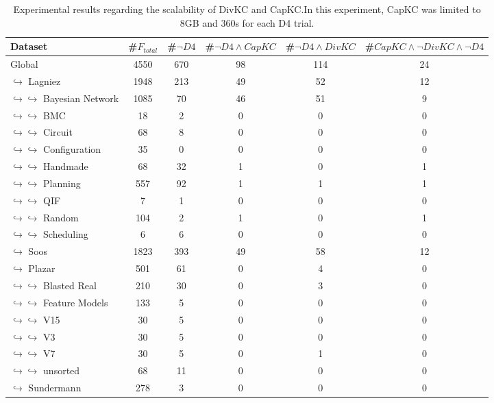 \documentclass{article}
\newcommand\dfour[0]{D4\xspace}
\newcommand\divkc[0]{DivKC\xspace}
\newcommand\capkc[0]{CapKC\xspace}
\begin{document}
    
\begin{table}[h!]
        \centering
        \begin{tabular}{l|c|c|c|c|c}
            Dataset & \#$F_\textit{total}$ & \#$\neg \textit{\dfour}$ & \#$\neg \textit{\dfour} \land \textit{\capkc}$ & \#$\neg \textit{\dfour} \land \textit{\divkc}$ &  \#$\textit{\capkc} \land \neg \textit{\divkc} \land \neg \textit{\dfour}$\\ 
            \hline
Global & 4550 & 670 & 98 & 114 & 24 \\
$\hookrightarrow$ Lagniez \cite{D4} & 1948 & 213 & 49 & 52 & 12 \\
$\hookrightarrow \hookrightarrow$ Bayesian Network & 1085 & 70 & 46 & 51 & 9 \\
$\hookrightarrow \hookrightarrow$ BMC & 18 & 2 & 0 & 0 & 0 \\
$\hookrightarrow \hookrightarrow$ Circuit & 68 & 8 & 0 & 0 & 0 \\
$\hookrightarrow \hookrightarrow$ Configuration & 35 & 0 & 0 & 0 & 0 \\
$\hookrightarrow \hookrightarrow$ Handmade & 68 & 32 & 1 & 0 & 1 \\
$\hookrightarrow \hookrightarrow$ Planning & 557 & 92 & 1 & 1 & 1 \\
$\hookrightarrow \hookrightarrow$ QIF & 7 & 1 & 0 & 0 & 0 \\
$\hookrightarrow \hookrightarrow$ Random & 104 & 2 & 1 & 0 & 1 \\
$\hookrightarrow \hookrightarrow$ Scheduling & 6 & 6 & 0 & 0 & 0 \\
$\hookrightarrow$ Soos \cite{soos_2024_10449477} & 1823 & 393 & 49 & 58 & 12 \\
$\hookrightarrow$ Plazar \cite{Plazar2019} & 501 & 61 & 0 & 4 & 0 \\
$\hookrightarrow \hookrightarrow$ Blasted Real & 210 & 30 & 0 & 3 & 0 \\
$\hookrightarrow \hookrightarrow$ Feature Models & 133 & 5 & 0 & 0 & 0 \\
$\hookrightarrow \hookrightarrow$ V15 & 30 & 5 & 0 & 0 & 0 \\
$\hookrightarrow \hookrightarrow$ V3 & 30 & 5 & 0 & 0 & 0 \\
$\hookrightarrow \hookrightarrow$ V7 & 30 & 5 & 0 & 1 & 0 \\
$\hookrightarrow \hookrightarrow$ unsorted & 68 & 11 & 0 & 0 & 0 \\
$\hookrightarrow$ Sundermann \cite{SBK+:SPLC24} & 278 & 3 & 0 & 0 & 0 \\
    \end{tabular}
            \caption{Experimental results regarding the scalability of \divkc and \capkc.In this experiment, \capkc was limited to 8GB and 360s for each \dfour trial.
        }
        \label{divkc:tab:gen}
    \end{table}
\end{document}
